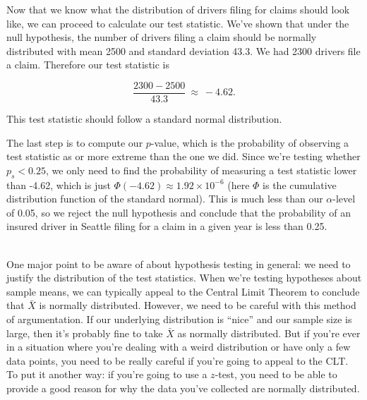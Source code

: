 Now that we know what the distribution of drivers filing for claims should look like, we can proceed to calculate our test statistic.  We've shown that under the null hypothesis, the number of drivers filing a claim should be normally distributed with mean 2500 and standard deviation 43.3.  We had 2300 drivers file a claim.  Therefore our test statistic is

\begin{equation*}

\frac{2300-2500}{43.3}\ \approx \  -4.62.

\end{equation*}

This test statistic should follow a standard normal distribution.



The last step is to compute our $p$-value, which is the probability of observing a test statistic as or more extreme than the one we did.  Since we're testing whether $p_s < 0.25$, we only need to find the probability of measuring a test statistic lower than -4.62, which is just $\Phi(-4.62)\approx 1.92\times 10^{-6}$ (here $\Phi$ is the cumulative distribution function of the standard normal).  This is much less than our $\alpha$-level of 0.05, so we reject the null hypothesis and conclude that the probability of an insured driver in Seattle filing for a claim in a given year is less than 0.25.





\ \\



One \nb  major point to be aware of about hypothesis testing in general: we need to justify the distribution of the test statistics. When we're testing hypotheses about sample means, we can typically appeal to the Central Limit Theorem to conclude that $\bar{X}$ is normally distributed.  However, we need to be careful with this method of argumentation.  If our underlying distribution is ``nice'' and our sample size is large, then it's probably fine to take $\bar{X}$ as normally distributed.  But if you're ever in a situation where you're dealing with a weird distribution or have only a few data points, you need to be really careful if you're going to appeal to the CLT.  To put it another way: if you're going to use a $z$-test, you need to be able to provide a good reason for why the data you've collected are normally distributed.



